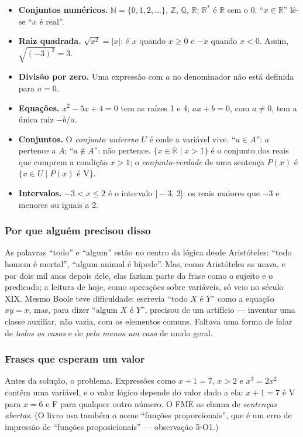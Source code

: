 \begin{minimo}
\begin{itemize}[leftmargin=1.2em]
  \item \textbf{Conjuntos numéricos.} $\mathbb{N}=\{0,1,2,\ldots\}$, $\mathbb{Z}$, $\mathbb{Q}$, $\mathbb{R}$; $\mathbb{R}^*$ é $\mathbb{R}$ sem o 0. \enquote{$x\in\mathbb{R}$} lê-se \enquote{$x$ é real}.
  \item \textbf{Raiz quadrada.} $\sqrt{x^2}=|x|$: é $x$ quando $x\ge0$ e $-x$ quando $x<0$. Assim, $\sqrt{(-3)^2}=3$.
  \item \textbf{Divisão por zero.} Uma expressão com $a$ no denominador não está definida para $a=0$.
  \item \textbf{Equações.} $x^2-5x+4=0$ tem as raízes 1 e 4; $ax+b=0$, com $a\neq0$, tem a única raiz $-b/a$.
  \item \textbf{Conjuntos.} O \emph{conjunto universo} $U$ é onde a variável vive. \enquote{$a\in A$}: $a$ pertence a $A$; \enquote{$a\notin A$}: não pertence. $\{x\in\mathbb{R}\mid x>1\}$ é o conjunto dos reais que cumprem a condição $x>1$; o \emph{conjunto-verdade} de uma sentença $P(x)$ é $\{x\in U\mid P(x)\text{ é V}\}$.
  \item \textbf{Intervalos.} $-3<x\le2$ é o intervalo $]-3,\,2]$: os reais maiores que $-3$ e menores ou iguais a 2.
\end{itemize}
\end{minimo}

\DeOndeVem

\subsubsection{Por que alguém precisou disso}
As palavras \enquote{todo} e \enquote{algum} estão no centro da lógica desde Aristóteles: \enquote{todo homem é mortal}, \enquote{algum animal é bípede}. Mas, como Aristóteles as usava, e por dois mil anos depois dele, elas faziam parte da frase como o sujeito e o predicado; a leitura de hoje, como operações sobre variáveis, só veio no século XIX. Mesmo Boole teve dificuldade: escrevia \enquote{todo $X$ é $Y$} como a equação $xy=x$, mas, para dizer \enquote{algum $X$ é $Y$}, precisou de um artifício — inventar uma classe auxiliar, não vazia, com os elementos comuns. Faltava uma forma de falar de \emph{todos os casos} e de \emph{pelo menos um caso} de modo geral.

\subsubsection{Frases que esperam um valor}
Antes da solução, o problema. Expressões como $x+1=7$, $x>2$ e $x^3=2x^2$ contêm uma variável, e o valor lógico depende do valor dado a ela: $x+1=7$ é V para $x=6$ e F para qualquer outro número. O FME as chama de \emph{sentenças abertas}. (O livro usa também o nome \enquote{funções proporcionais}, que é um erro de impressão de \enquote{funções proposicionais} — observação 5-O1.)

